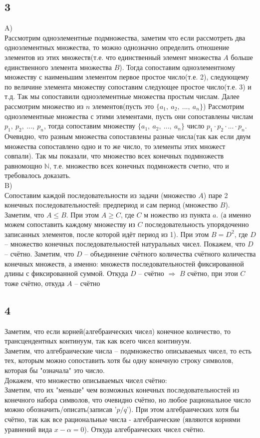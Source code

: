 		\subsection{3}
		A)\\
		Рассмотрим одноэлементные подмножества, заметим что если рассмотреть два одноэлементных множества, то можно однозначно определить отношение элементов из этих множеств(т.е. что единственный элемент множества $A$ больше единственного элемента множества $B$). Тогда сопоставим одноэлементному множеству с наименьшим элементом первое простое число(т.е. 2), следующему по величине элемента множеству сопоставим следующее простое число(т.е. 3) и т.д. Так мы сопоставили одноэлементные множества простым числам. Далее рассмотрим множество из $n$ элементов(пусть это $\{ a_1,\: a_2,\: ... ,\: a_n \}$) Рассмотрим одноэлементные множества с этими элементами, пусть они сопоставлены числам $p_1,\: p_2,\:... ,\: p_n $, тогда сопоставим множеству $\{ a_1,\: a_2,\: ... ,\: a_n \}$ число $p_1 \cdot p_2 \cdot ... \cdot p_n$. Очевидно, что разным множества сопоставлены разные числа(так как если двум множества сопоставлено одно и то же число, то элементы этих множест совпали). Так мы показали, что множество всех конечных подмножеств равномощно $\mathbb{N}$, т.е. множество всех конечных подмножеств счетно, что и требовалось доказать.
		\\
		B)\\
		Сопоставим каждой последовательности из задачи (множество $A$) паре 2 конечных последовательностей: предпериод и сам период (множество $B$). Заметим, что $A \leqslant B$. При этом $A \geqslant C$, где $C$ м ножество из пункта $a$. (а именно можем сопоставить каждому множеству из $C$ последовательность упорядоченно записанных элементов, после которой идёт период из 1). При этом $B = D^2$, где $D$ -- множество конечных последовательностей натуральных чисел. Покажем, что $D$ -- счётно. Заметим, что $D$ -- объединение счётного количества счётного количества конечных множеств, а именно: множеств последовательностей фиксированной длины с фиксированной суммой. Откуда $D$ -- счётно $\Rightarrow$ $B$ счётно, при этои $C$ тоже счётно, откуда $A$ -- счётно
		
		\subsection{4}
		Заметим, что если корней(алгебраических чисел) конечное количество, то трансцендентных континуум, так как всего чисел континуум.\\
		Заметим, что алгебраические числа --  подмножество описываемых чисел, то есть тех, которым можно сопоставить хотя бы одну конечную строку символов, которая бы "означала" это число.\\
		Докажем, что множество описываемых чисел счётно:\\
		Заметим, что их "меньше" чем возможных конечных последовательностей из конечного набора символов, что очевидно счётно, но любое рациональное число можно обозначить/описать(записав '$p/q$'). При этом алгебраических хотя бы счётно, так как все рациональные числа - алгебраические (являются корнями уравнений вида $x - \alpha = 0$). Откуда алгебраических чисел счётно.
		
